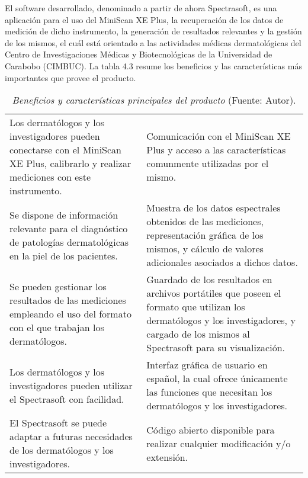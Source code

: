 	El software desarrollado, denominado a partir de ahora Spectrasoft, es una aplicaci\'{o}n para el uso del MiniScan XE Plus, la recuperaci\'{o}n de los datos de medici\'{o}n de dicho instrumento, la generaci\'{o}n de resultados relevantes y la gesti\'{o}n de los mismos, el cu\'{a}l est\'{a} orientado a las actividades m\'{e}dicas dermatol\'{o}gicas del Centro de Investigaciones M\'{e}dicas y Biotecnol\'{o}gicas de la Universidad de Carabobo (CIMBUC). La tabla 4.3 resume los beneficios y las caracter\'{i}sticas m\'{a}s importantes que provee el producto.
	
	\begin{table}[h]
		\small
		\caption[Beneficios y caracter\'{i}sticas principales del producto]{\textit{Beneficios y caracter\'{i}sticas principales del producto} (Fuente: Autor).}
		\centering
		\setlength{\extrarowheight}{\altocelda}
		\begin{tabulary}{\anchotabla}{|J|J|}
			\hline
			 & \\ \hline
			Los dermat\'{o}logos y los investigadores pueden conectarse con el MiniScan XE Plus, calibrarlo y realizar mediciones con este instrumento. & 
			Comunicaci\'{o}n con el MiniScan XE Plus y acceso a las caracter\'{i}sticas comunmente utilizadas por el mismo.\\ \hline
			Se dispone de informaci\'{o}n relevante para el diagn\'{o}stico de patolog\'{i}as dermatol\'{o}gicas en la piel de los pacientes. &
			Muestra de los datos espectrales obtenidos de las mediciones, representaci\'{o}n gr\'{a}fica de los mismos, y c\'{a}lculo de valores adicionales asociados a dichos datos.\\ \hline
			Se pueden gestionar los resultados de las mediciones empleando el uso del formato con el que trabajan los dermat\'{o}logos. &
			Guardado de los resultados en archivos port\'{a}tiles que poseen el formato que utilizan los dermat\'{o}logos y los investigadores, y cargado de los mismos al Spectrasoft para su visualizaci\'{o}n.\\ \hline
			Los dermat\'{o}logos y los investigadores pueden utilizar el Spectrasoft con facilidad. &
			Interfaz gr\'{a}fica de usuario en espa\~{n}ol, la cual ofrece \'{u}nicamente las funciones que necesitan los dermat\'{o}logos y los investigadores.\\ \hline
			El Spectrasoft se puede adaptar a futuras necesidades de los dermat\'{o}logos y los investigadores. &
			C\'{o}digo abierto disponible para realizar cualquier modificaci\'{o}n y/o extensi\'{o}n.\\ \hline
		\end{tabulary}
	\end{table}
	
